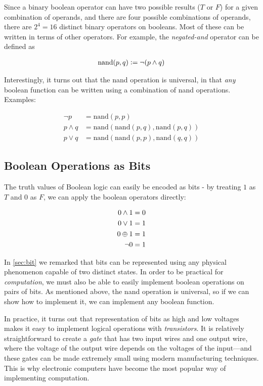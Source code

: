 Since a binary boolean operator can have two possible results ($T$ or
$F$) for a given combination of operands, and there are four possible
combinations of operands, there are $2^{4}=16$ distinct binary
operators on booleans.  Most of these can be written in terms of other
operators.  For example, the \emph{negated-and} operator can be defined as

\begin{align}
  \mathrm{nand}(p,q) \vcentcolon= \neg (p \land q)
\end{align}

Interestingly, it turns out that the nand operation is universal, in
that \emph{any} boolean function can be written using a combination of
nand operations.  Examples:

\begin{align}
  \neg p &= \mathrm{nand}(p,p) \\
  p \land q &= \mathrm{nand}(\mathrm{nand}(p,q),\mathrm{nand}(p,q)) \\
  p \lor q &= \mathrm{nand}(\mathrm{nand}(p,p),\mathrm{nand}(q,q))
\end{align}

\subsection{Boolean Operations as Bits}

The truth values of Boolean logic can easily be encoded as bits - by
treating $1$ as $T$ and $0$ as $F$, we can apply the boolean operators
directly:

\begin{align}
  0 \land 1 &= 0 \\
  0 \lor 1 &= 1 \\
  0 \oplus 1 &= 1 \\
  \neg 0 &= 1
\end{align}

In \cref{sec:bit} we remarked that bits can be represented using any
physical phenomenon capable of two distinct states.  In order to be
practical for \emph{computation}, we must also be able to easily
implement boolean operations on pairs of bits.  As mentioned above,
the nand operation is universal, so if we can show how to implement
it, we can implement any boolean function.

In practice, it turns out that representation of bits as high and low
voltages makes it easy to implement logical operations with
\emph{transistors}.  It is relatively straightforward to create a
\emph{gate} that has two input wires and one output wire, where the
voltage of the output wire depends on the voltages of the input---and
these gates can be made extremely small using modern manufacturing
techniques.  This is why electronic computers have become the most
popular way of implementing computation.


